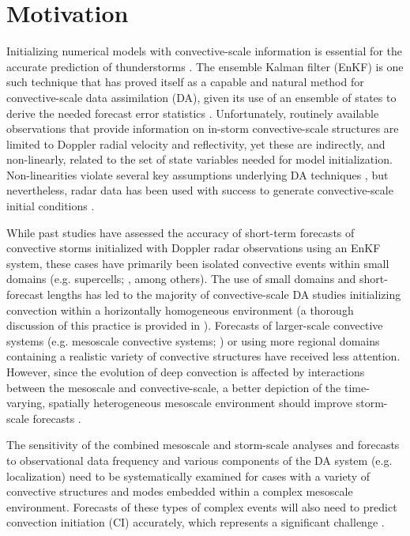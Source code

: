 \chapter{Motivation}
Initializing numerical models with convective-scale information is essential for the accurate prediction of thunderstorms \citep{lilly90}. The ensemble Kalman filter (EnKF) is one such technique that has proved itself as a capable and natural method for convective-scale data assimilation (DA), given its use of an ensemble of states to derive the needed forecast error statistics \citep{evensen94,snyderzhang03}. Unfortunately, routinely available observations that provide information on in-storm convective-scale structures are limited to Doppler radial velocity and reflectivity, yet these are indirectly, and non-linearly, related to the set of state variables needed for model initialization. Non-linearities violate several key assumptions underlying DA techniques \citep{kalnaybook}, but nevertheless, radar data has  been used with success to generate convective-scale initial conditions \citep{sun05}.

While past studies have assessed the accuracy of short-term forecasts of convective storms initialized with Doppler radar observations using an EnKF system, these cases have primarily been isolated convective events within small domains (e.g. supercells; \citealt{dowellwicker09,dowelletal11,dawsonetal12}, among others). The use of small domains and short-forecast lengths has led to the majority of convective-scale DA studies initializing convection within a horizontally homogeneous environment (a thorough discussion of this practice is provided in \citealt{dawsonetal12}). Forecasts of larger-scale convective systems (e.g. mesoscale convective systems; \citealt{wheatleystensrud10,snooketal12}) or using more regional domains containing a realistic variety of convective structures have received less attention. However, since the evolution of deep convection is affected by interactions between the mesoscale and convective-scale, a better depiction of the time-varying, spatially heterogeneous mesoscale environment should improve storm-scale forecasts \citep{stensrudgao10,stensrudetal13}. 

The sensitivity of the combined mesoscale and storm-scale analyses and forecasts to observational data frequency and various components of the DA system (e.g. localization) need to be systematically examined for cases with a variety of convective structures and modes embedded within a complex mesoscale environment. Forecasts of these types of complex events will also need to predict convection initiation (CI) accurately, which represents a significant challenge \citep{kainetal10}.

